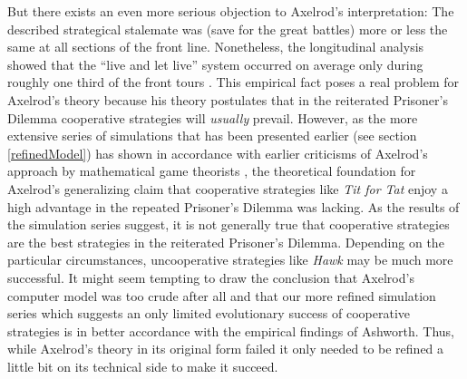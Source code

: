 But there exists an even more serious objection to Axelrod's
interpretation: The described strategical stalemate was (save for the
great battles) more or less the same at all sections of the front line.
Nonetheless, the longitudinal analysis showed that the ``live and let
live'' system occurred on average only during roughly one third of the
front tours \cite[p.\ 171-175]{ashworth:1980}. This empirical fact poses
a real problem for Axelrod's theory because his theory postulates that
in the reiterated Prisoner's Dilemma cooperative strategies will
{\em usually} prevail. However, as the more extensive series
of simulations that has been presented earlier (see section
\ref{refinedModel}) has shown in accordance with earlier criticisms of
Axelrod's approach by mathematical game theorists
\cite[p.\ 313ff.]{binmore:1998}, the theoretical foundation for Axelrod's
generalizing claim that cooperative strategies like {\em Tit for Tat}
enjoy a high advantage in the repeated Prisoner's Dilemma was lacking.
As the results of the simulation series suggest, it is not generally true
that cooperative strategies are the best strategies in the reiterated
Prisoner's Dilemma.  Depending on the particular circumstances,
uncooperative strategies like {\em Hawk} may be much more successful.
It might seem tempting to draw the conclusion that Axelrod's computer
model was too crude after all and that our more refined simulation
series which suggests an only limited evolutionary success of
cooperative strategies is in better accordance with the empirical
findings of Ashworth. Thus, while Axelrod's theory in its original
form failed it only needed to be refined a little bit on its technical
side to make it succeed.

